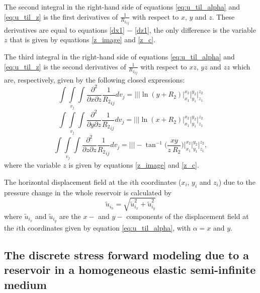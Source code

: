 \documentclass[journal abbreviation, manuscript]{copernicus}
\begin{document}
The second integral in the right-hand side of  equations  \ref{eq:u_til_alpha} and  \ref{eq:u_til_z} is the first derivatives of ${\frac{1}{{R_2}_{ij}}}$ with respect to $x$, $y$ and $z$.
These derivatives are equal to equations \ref{dx1} $-$ \ref{dz1}, the only difference is the variable $z$  that is given by equations \ref{z_image}  and \ref{z_c}.

The third integral in the right-hand side of  equations  \ref{eq:u_til_alpha}  and  \ref{eq:u_til_z} is the second derivatives of ${\frac{1}{{R_2}_{ij}}}$ with respect to $xz$, $yz$ and $zz$ which are, respectively, given by the following closed expressions: 
\begin{equation}
\int\int\limits_{v_j}\int 
\frac{\partial^{2}  }{\partial x \partial z} {\frac{1}{{R_2}_{ij}}}  dv_j = \Bigg|\Bigg|\Bigg| 
\ln(y + {R_2})
\Bigg|_{x_1}^{x_2} \Bigg|_{y_1}^{y_2} \Bigg|_{z_1}^{z_2}
\label{dx2}
\end{equation}
\begin{equation}
\int\int\limits_{v_j}\int
\frac{\partial^{2}  }{\partial y \partial z} {\frac{1}{{R_2}_{ij}}}  dv_j =
\Bigg|\Bigg|\Bigg|
\ln(x + {R_2})
\Bigg|_{x_1}^{x_2} \Bigg|_{y_1}^{y_2} \Bigg|_{z_1}^{z_2}
\label{dy2}
\end{equation}
\begin{equation}
\int\int\limits_{v_j}\int
\frac{\partial^{2}  }{\partial z \partial z} {\frac{1}{{R_2}_{ij}}}  dv_j =
\Bigg|\Bigg|\Bigg|
 -   \tan^{-1} \Bigg( \frac{xy}{z \:{R_2}} \Bigg)
\Bigg|_{x_1}^{x_2} \Bigg|_{y_1}^{y_2} \Bigg|_{z_1}^{z_2}, 
\label{dz2}
\end{equation}
where the variable $z$ is given by equations \ref{z_image}  and \ref{z_c}.

The horizontal displacement field at the $i$th coordinates ($x_i$, $y_i$  and $z_i$) due to the pressure change in the whole reservoir is calculated by 
\begin{equation}
{\tilde{u}}_{{i}_h} = \sqrt{ {\tilde{u}}_{{i}_x}^{2}  +  {\tilde{u}}_{{i}_y}^{2} }  
\label{eq:horizontal_displacement}
\end{equation}
where ${\tilde{u}}_{{i}_x}$ and ${\tilde{u}}_{{i}_y}$ are the $x-$ and $y-$ components of the displacement field at the $i$th coordinates given by equation \ref{eq:u_til_alpha}, with $\alpha = x $ and $y$.


\subsection{The discrete stress forward modeling due to a reservoir in a homogeneous elastic semi-infinite medium}
\end{document}
